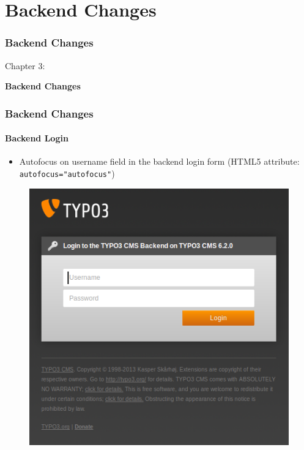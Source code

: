 %

\section{Backend Changes}
\begin{frame}[fragile]
	\frametitle{Backend Changes}

	\begin{center}\huge{Chapter 3:}\end{center}
	\begin{center}\huge{\color{typo3darkgrey}\textbf{Backend Changes}}\end{center}

\end{frame}


\begin{frame}[fragile]
	\frametitle{Backend Changes}
	\framesubtitle{Backend Login}

 	\begin{itemize}
		\item Autofocus on username field in the backend login form\newline
			(HTML5 attribute: \texttt{autofocus="autofocus"})
	\end{itemize}

	\begin{figure}
		\includegraphics[width=0.4\linewidth]{Images/BackendChanges/BackendLogin.png}
	\end{figure}

\end{frame}

